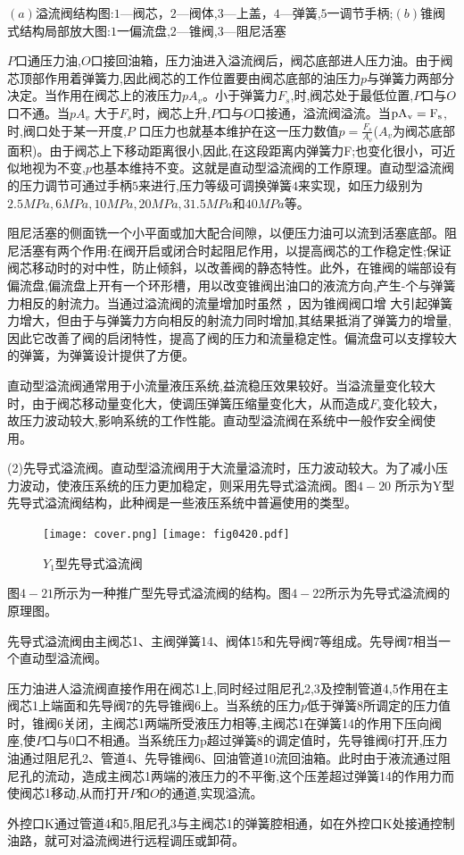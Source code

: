 $(a)$溢流阀结构图:$1$—阀芯，$2$—阀体,$3$—上盖，$4$—弹簧,$5一$调节手柄;$(b)$锥阀式结构局部放大图:$1$一偏流盘,$2$—锥阀,$3$—阻尼活塞

$P$口通压力油,$O$口接回油箱，压力油进入溢流阀后，阀芯底部进人压力油。由于阀芯顶部作用着弹簧力,因此阀芯的工作位置要由阀芯底部的油压力$p$与弹簧力两部分决定。当作用在阀芯上的液压力$pA_v$。小于弹簧力$F_s$,时,阀芯处于最低位置,$P$口与$O$口不通。当$pA_v$ 大于$F_s$时，阀芯上升,$P$口与$O$口接通，溢流阀溢流。当$\rm pA_v=F_s$,时,阀口处于某一开度,$P$ 口压力也就基本维护在这一压力数值$p=\frac{F_s}{A_v}$($A_v$为阀芯底部面积)。由于阀芯上下移动距离很小,因此,在这段距离内弹簧力F;也变化很小，可近似地视为不变,$p$也基本维持不变。这就是直动型溢流阀的工作原理。直动型溢流阀的压力调节可通过手柄$5$来进行,压力等级可调换弹簧$4$来实现，如压力级别为$2. 5 MPa,$6$ MPa,10 MPa ,20 MPa,31.5 MPa$和$40 MPa$等。

阻尼活塞的侧面铣一个小平面或加大配合间隙，以便压力油可以流到活塞底部。阻尼活塞有两个作用:在阀开启或闭合时起阻尼作用，以提高阀芯的工作稳定性;保证阀芯移动时的对中性，防止倾斜，以改善阀的静态特性。此外，在锥阀的端部设有偏流盘,偏流盘上开有一个环形槽，用以改变锥阀出油口的液流方向,产生-个与弹簧力相反的射流力。当通过溢流阀的流量增加时虽然 ，因为锥阀阀口增 大引起弹簧力增大，但由于与弹簧力方向相反的射流力同时增加,其结果抵消了弹簧力的增量,因此它改善了阀的启闭特性，提高了阀的压力和流量稳定性。偏流盘可以支撑较大的弹簧，为弹簧设计提供了方便。

直动型溢流阀通常用于小流量液压系统,益流稳压效果较好。当溢流量变化较大时，由于阀芯移动量变化大，使调压弹簧压缩量变化大，从而造成$F_s$变化较大，故压力波动较大,影响系统的工作性能。直动型溢流阀在系统中一般作安全阀使用。

(2)先导式溢流阀。直动型溢流阀用于大流量溢流时，压力波动较大。为了减小压力波动，使液压系统的压力更加稳定，则采用先导式溢流阀。图$4-20$ 所示为Y型先导式溢流阀结构，此种阀是一些液压系统中普遍使用的类型。
\begin{figure}
    \centering
    \ifOpenSource
    \texttt{[image: cover.png]}
    \else
    \texttt{[image: fig0420.pdf]} 
     \fi
     \caption{ $Y_1$型先导式溢流阀}
    \label{fig:fig0420}
       
\end{figure}





图$4-21$所示为一种推广型先导式溢流阀的结构。图$4-22$所示为先导式溢流阀的原理图。

先导式溢流阀由主阀芯1、主阀弹簧14、阀体15和先导阀$7$等组成。先导阀$7$相当一个直动型溢流阀。

压力油进人溢流阀直接作用在阀芯1上,同时经过阻尼孔2,3及控制管道4,5作用在主阀芯1上端面和先导阀$7$的先导锥阀6上。当系统的压力$p$低于弹簧8所调定的压力值时，锥阀6关闭，主阀芯1两端所受液压力相等,主阀芯1在弹簧14的作用下压向阀座,使$P$口与$0$口不相通。当系统压力p超过弹簧8的调定值时，先导锥阀6打开,压力油通过阻尼孔2、管道4、先导锥阀6、回油管道10流回油箱。此时由于液流通过阻尼孔的流动，造成主阀芯1两端的液压力的不平衡,这个压差超过弹簧14的作用力而使阀芯1移动,从而打开$P$和$O$的通道,实现溢流。

外控口K通过管道4和5,阻尼孔3与主阀芯1的弹簧腔相通，如在外控口K处接通控制油路，就可对溢流阀进行远程调压或卸荷。
